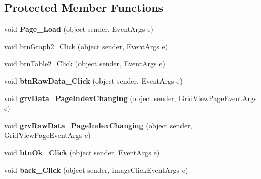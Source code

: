 \subsection*{Protected Member Functions}
\begin{DoxyCompactItemize}
\item 
\hypertarget{classusertrackmyhealth__position_a4af7eb2ce3c2ba118b520ed1c4aa5642}{void {\bfseries Page\-\_\-\-Load} (object sender, Event\-Args e)}\label{classusertrackmyhealth__position_a4af7eb2ce3c2ba118b520ed1c4aa5642}

\item 
void \hyperlink{classusertrackmyhealth__position_a81b1a9b926be37ef8c7cfc383c5963dc}{btn\-Graph2\-\_\-\-Click} (object sender, Event\-Args e)
\item 
void \hyperlink{classusertrackmyhealth__position_a2e835da3af462a7a3446b6dd251a28ab}{btn\-Table2\-\_\-\-Click} (object sender, Event\-Args e)
\item 
\hypertarget{classusertrackmyhealth__position_ae995c35290c1990365342a1b9107475c}{void {\bfseries btn\-Raw\-Data\-\_\-\-Click} (object sender, Event\-Args e)}\label{classusertrackmyhealth__position_ae995c35290c1990365342a1b9107475c}

\item 
\hypertarget{classusertrackmyhealth__position_af507dcfcd9ec6040b330137cafe60473}{void {\bfseries grv\-Data\-\_\-\-Page\-Index\-Changing} (object sender, Grid\-View\-Page\-Event\-Args e)}\label{classusertrackmyhealth__position_af507dcfcd9ec6040b330137cafe60473}

\item 
\hypertarget{classusertrackmyhealth__position_a163ce22c4976b3f13ca5dcd34eb1243c}{void {\bfseries grv\-Raw\-Data\-\_\-\-Page\-Index\-Changing} (object sender, Grid\-View\-Page\-Event\-Args e)}\label{classusertrackmyhealth__position_a163ce22c4976b3f13ca5dcd34eb1243c}

\item 
\hypertarget{classusertrackmyhealth__position_a7a260045a89867653e0c5ca49aa4f7c9}{void {\bfseries btn\-Ok\-\_\-\-Click} (object sender, Event\-Args e)}\label{classusertrackmyhealth__position_a7a260045a89867653e0c5ca49aa4f7c9}

\item 
\hypertarget{classusertrackmyhealth__position_af23f866f6756c81d586b4f415ce9fa5d}{void {\bfseries back\-\_\-\-Click} (object sender, Image\-Click\-Event\-Args e)}\label{classusertrackmyhealth__position_af23f866f6756c81d586b4f415ce9fa5d}


\end{DoxyCompactItemize}
